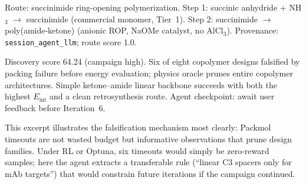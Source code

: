 \documentclass[twocolumn]{fairmeta}
\begin{document}
\begin{toolcall}
\scriptsize
Route: succinimide ring-opening polymerization.
Step 1: succinic anhydride + NH$_3$ $\to$ succinimide (commercial monomer, Tier~1).
Step 2: succinimide $\to$ poly(amide-ketone) (anionic ROP, NaOMe catalyst, no AlCl$_3$).
Provenance: \texttt{session\_agent\_llm}; route score 1.0.
\end{toolcall}

\begin{observation}
\scriptsize
Discovery score 64.24 (campaign high).
Six of eight copolymer designs falsified by packing failure before energy evaluation; physics oracle prunes entire copolymer architectures.
Simple ketone--amide linear backbone succeeds with both the highest $E_\text{int}$ and a clean retrosynthesis route.
Agent checkpoint: await user feedback before Iteration~6.
\end{observation}

\noindent This excerpt illustrates the falsification mechanism most clearly: Packmol timeouts are not wasted budget but informative observations that prune design families.
Under RL or Optuna, six timeouts would simply be zero-reward samples; here the agent extracts a transferable rule (``linear C3 spacers only for mAb targets'') that would constrain future iterations if the campaign continued.
\end{document}
